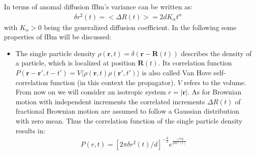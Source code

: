\documentclass[
  a4paper,BCOR10mm,oneside,
  bibtotoc,idxtotoc,
  headsepline,footsepline,%
  fleqn,openbib
]{scrbook}
\begin{document}
In terms of anomal diffusion fBm's variance can be written as:
\begin{align}
\delta r^{2}(t)= < \Delta R(t)>=2dK_{\alpha}t^{\alpha}
\end{align}
with $K_{\alpha}>0$  being the generalized diffusion coefficient.
\newline
In the following some properties of fBm will be discussed:
\begin{itemize}
 \item The single particle density $\rho(\bm{r},t)=\delta(\bm{r}-\bm{R}(t))$ describes the density of a particle, which is localized at position $\bm{R}(t)$. Its correlation function $P(\bm{r}-\bm{r}',t-t')= V\langle\rho(\bm{r},t) \rho(\bm{r}',t')\rangle$ is also called Van Hove self-correlation function (in this context the propagator). $V$ refers to the volume. From now on we will consider an isotropic system $ r= |\bm{r}|$. As for Brownian motion with independent increments the correlated increments  $\Delta R(t)$ of fractional Brownian motion are assumed to follow a Gaussian distribution with zero mean. Thus the correlation function of the single particle density results in:
\begin{align}
 P(r,t)=[2 \pi \delta r^{2}(t)/d]^{-\frac{d}{2}} e^{ \frac{-r^2 d}{2 \delta r^{2}(t) }}
\end{align}


\end{itemize}
\end{document}
